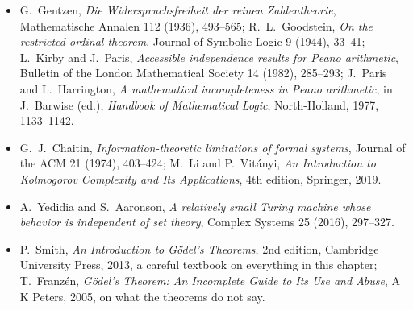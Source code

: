 \begin{itemize}
\item G.~Gentzen, \emph{Die Widerspruchsfreiheit der reinen Zahlentheorie}, Mathematische Annalen 112 (1936), 493--565; R.~L.~Goodstein, \emph{On the restricted ordinal theorem}, Journal of Symbolic Logic 9 (1944), 33--41; L.~Kirby and J.~Paris, \emph{Accessible independence results for Peano arithmetic}, Bulletin of the London Mathematical Society 14 (1982), 285--293; J.~Paris and L.~Harrington, \emph{A mathematical incompleteness in Peano arithmetic}, in J.~Barwise (ed.), \emph{Handbook of Mathematical Logic}, North-Holland, 1977, 1133--1142.
\item G.~J.~Chaitin, \emph{Information-theoretic limitations of formal systems}, Journal of the ACM 21 (1974), 403--424; M.~Li and P.~Vitányi, \emph{An Introduction to Kolmogorov Complexity and Its Applications}, 4th edition, Springer, 2019.
\item A.~Yedidia and S.~Aaronson, \emph{A relatively small Turing machine whose behavior is independent of set theory}, Complex Systems 25 (2016), 297--327.
\item P.~Smith, \emph{An Introduction to Gödel's Theorems}, 2nd edition, Cambridge University Press, 2013, a careful textbook on everything in this chapter; T.~Franzén, \emph{Gödel's Theorem: An Incomplete Guide to Its Use and Abuse}, A K Peters, 2005, on what the theorems do not say.
\end{itemize}
